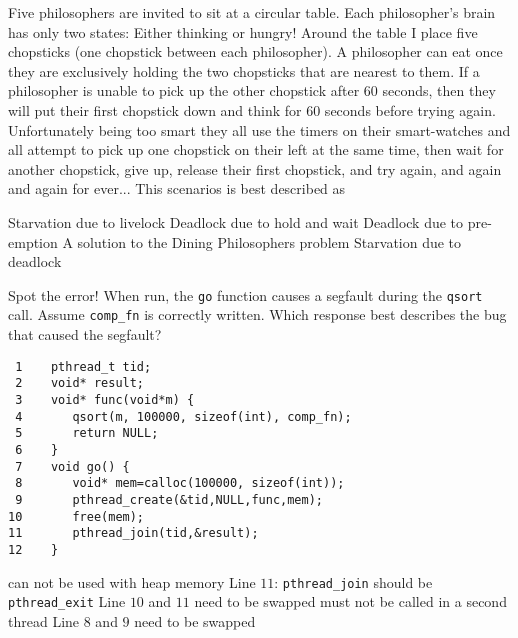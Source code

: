 \variant


Five philosophers are invited to sit at a circular table. Each philosopher's brain has only two states:  Either thinking or hungry! Around the table I place five chopsticks (one chopstick between each philosopher). A philosopher can eat once they are exclusively holding the two chopsticks that are nearest to them. If a philosopher is unable to pick up the other chopstick after 60 seconds, then they will put their first chopstick down and think for 60 seconds before trying again. Unfortunately being too smart they all use the timers on their smart-watches and all attempt to pick up one chopstick on their left at the same time, then wait for another chopstick, give up, release their first chopstick, and try again, and again and again for ever... This scenarios is best described as 
\begin{answers}
\correctanswer Starvation due to livelock
\answer Deadlock due to hold and wait
\answer Deadlock due to pre-emption
\answer A solution to the Dining Philosophers problem
\answer Starvation due to deadlock
\end{answers}
\begin{solution}
\end{solution}


\variant
Spot the error! When run, the {\tt go} function causes a segfault during the {\tt qsort} call. Assume  {\tt comp_fn} is correctly written. Which response best describes the bug that caused the segfault?
\begin{verbatim}
 1    pthread_t tid;
 2    void* result;
 3    void* func(void*m) {
 4       qsort(m, 100000, sizeof(int), comp_fn);
 5       return NULL;
 6    }
 7    void go() { 
 8       void* mem=calloc(100000, sizeof(int));      
 9       pthread_create(&tid,NULL,func,mem);
10       free(mem);
11       pthread_join(tid,&result);
12    }
\end{verbatim}
\begin{answers}
 can not be used with heap memory
\answer Line $11$: {\tt pthread_join} should be {\tt pthread_exit}
\correctanswer Line $10$ and $11$ need to be swapped
 must not be called in a second thread
\answer Line $8$ and $9$ need to be swapped
\end{answers}
\begin{solution}
\end{solution}



